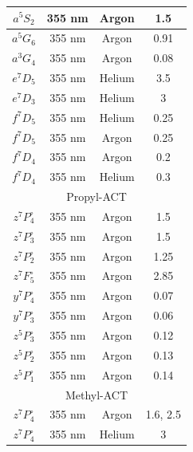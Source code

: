 \documentclass[12pt,twoside]{reedthesis}
\begin{document}
\begin{longtable}{||c|c|c|c||}
            $a^{5}S_{2}$ & 355 nm & Argon & 1.5 \\\hline
            $a^{5}G_{6}$ & 355 nm & Argon & 0.91 \\\hline
            $a^{3}G_{4}$ & 355 nm & Argon & 0.08 \\\hline
            $e^{7}D_{5}$ & 355 nm & Helium & 3.5 \\\hline
            $e^{7}D_{3}$ & 355 nm & Helium & 3 \\\hline
            $f^{7}D_{5}$ & 355 nm & Helium & 0.25 \\\hline
            $f^{7}D_{5}$ & 355 nm & Argon & 0.25 \\\hline
            $f^{7}D_{4}$ & 355 nm & Argon & 0.2 \\\hline
            $f^{7}D_{4}$ & 355 nm & Helium & 0.3 \\\hline
            \multicolumn{4}{||c||}{Propyl-ACT} \\\hline
            $z^{7}P^{\circ}_{4}$ & 355 nm & Argon & 1.5 \\\hline
            $z^{7}P^{\circ}_{3}$ & 355 nm & Argon & 1.5 \\\hline
            $z^{7}P^{\circ}_{2}$ & 355 nm & Argon & 1.25 \\\hline
            $z^{7}F^{\circ}_{5}$ & 355 nm & Argon & 2.85 \\\hline
            $y^{7}P^{\circ}_{4}$ & 355 nm & Argon & 0.07 \\\hline
            $y^{7}P^{\circ}_{3}$ & 355 nm & Argon & 0.06 \\\hline
            $z^{5}P^{\circ}_{3}$ & 355 nm & Argon & 0.12 \\\hline
            $z^{5}P^{\circ}_{2}$ & 355 nm & Argon & 0.13 \\\hline
            $z^{5}P^{\circ}_{1}$ & 355 nm & Argon & 0.14 \\\hline
            \multicolumn{4}{||c||}{Methyl-ACT} \\\hline
            $z^{7}P^{\circ}_{4}$ & 355 nm & Argon & 1.6, 2.5 \\\hline
            $z^{7}P^{\circ}_{4}$ & 355 nm & Helium & 3 \\\hline

\end{longtable}
\end{document}
